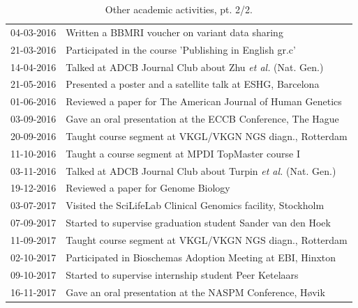 \begin{appendices}
\begin{table}
\begin{tabulary}{\linewidth}{LL}
  \rule{0pt}{2.5ex}\mbox{04-03-2016} & Written a BBMRI voucher on variant data sharing\\
  \rule{0pt}{2.5ex}\mbox{21-03-2016} & Participated in the course 'Publishing in English gr.c' \\
  \rule{0pt}{2.5ex}\mbox{14-04-2016} & Talked at ADCB Journal Club about Zhu \textsl{et al.} (Nat. Gen.) \\
  \rule{0pt}{2.5ex}\mbox{21-05-2016} & Presented a poster and a satellite talk at ESHG, Barcelona \\
  \rule{0pt}{2.5ex}\mbox{01-06-2016} & Reviewed a paper for The American Journal of Human Genetics \\
  \rule{0pt}{2.5ex}\mbox{03-09-2016} & Gave an oral presentation at the ECCB Conference, The Hague \\
  \rule{0pt}{2.5ex}\mbox{20-09-2016} & Taught course segment at VKGL/VKGN NGS diagn., Rotterdam \\
  \rule{0pt}{2.5ex}\mbox{11-10-2016} & Taught a course segment at MPDI TopMaster course I \\
  \rule{0pt}{2.5ex}\mbox{03-11-2016} & Talked at ADCB Journal Club about Turpin \textsl{et al.} (Nat. Gen.) \\
  \rule{0pt}{2.5ex}\mbox{19-12-2016} & Reviewed a paper for Genome Biology \\
  \rule{0pt}{2.5ex}\mbox{03-07-2017} & Visited the SciLifeLab Clinical Genomics facility, Stockholm \\
  \rule{0pt}{2.5ex}\mbox{07-09-2017} & Started to supervise graduation student Sander van den Hoek\\
  \rule{0pt}{2.5ex}\mbox{11-09-2017} & Taught course segment at VKGL/VKGN NGS diagn., Rotterdam \\
  \rule{0pt}{2.5ex}\mbox{02-10-2017} & Participated in Bioschemas Adoption Meeting at EBI, Hinxton \\
  \rule{0pt}{2.5ex}\mbox{09-10-2017} & Started to supervise internship student Peer Ketelaars\\
  \rule{0pt}{2.5ex}\mbox{16-11-2017} & Gave an oral presentation at the NASPM Conference, Høvik \\
  \hline
\end{tabulary}
\caption[Other academic activities, pt. 2/2]{Other academic activities, pt. 2/2.}
\label{table:appendix_activities_2}
\end{table}

\end{appendices}

\clearpage
\pagestyle{empty}

